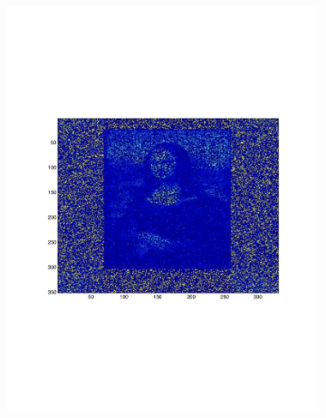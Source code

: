 \begin{figure}[h!tbp]
\begin{subfigure}[d]{0.3\textwidth}
        \includegraphics[width=\textwidth]{img/p5_m2_lam1.pdf}
    \end{subfigure}
    \begin{subfigure}[e]{0.3\textwidth}

\end{subfigure}
\end{figure}
